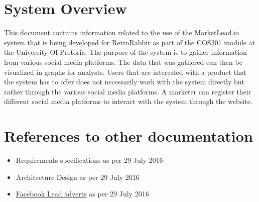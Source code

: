 \documentclass{article}
\begin{document}
	\cleardoublepage
	\tableofcontents
	\cleardoublepage
	
	\section{System Overview}
		This document contains information related to the use of the MarketLead.io system that is being developed for RetroRabbit as part of the COS301 module at the University Of Pretoria. The purpose of the system is to gather information from various social media platforms. The data that was gathered can then be visualized in graphs for analysts. Users that are interested with a product that the system has to offer does not necessarily work with the system directly but rather through the various social media platforms. A marketer can register their different social media platforms to interact with the system through the website.

	\section{References to other documentation}
		\begin{itemize}
			\item{Requirements specifications as per 29 July 2016}
			\item{Architecture Design as per 29 July 2016}
			\item{\href{https://www.facebook.com/business/a/lead-ads}{Facebook Lead adverts} as per 29 July 2016}
		\end{itemize}
\end{document}
